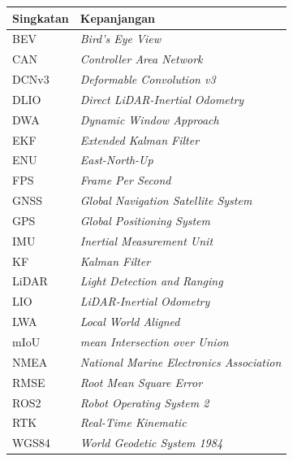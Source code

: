 \vspace{2ex}
\begin{longtable}{p{} p{}}
\hline
\textbf{Singkatan} & \textbf{Kepanjangan} \\
\hline
\endhead
BEV & \emph{Bird's Eye View} \\
CAN & \emph{Controller Area Network} \\
DCNv3 & \emph{Deformable Convolution v3} \\
DLIO & \emph{Direct LiDAR-Inertial Odometry} \\
DWA & \emph{Dynamic Window Approach} \\
EKF & \emph{Extended Kalman Filter} \\
ENU & \emph{East-North-Up} \\
FPS & \emph{Frame Per Second} \\
GNSS & \emph{Global Navigation Satellite System} \\
GPS & \emph{Global Positioning System} \\
IMU & \emph{Inertial Measurement Unit} \\
KF & \emph{Kalman Filter} \\
LiDAR & \emph{Light Detection and Ranging} \\
LIO & \emph{LiDAR-Inertial Odometry} \\
LWA & \emph{Local World Aligned} \\
mIoU & \emph{mean Intersection over Union} \\
NMEA & \emph{National Marine Electronics Association} \\
RMSE & \emph{Root Mean Square Error} \\
ROS2 & \emph{Robot Operating System 2} \\
RTK & \emph{Real-Time Kinematic} \\
WGS84 & \emph{World Geodetic System 1984} \\
\hline
\end{longtable}
